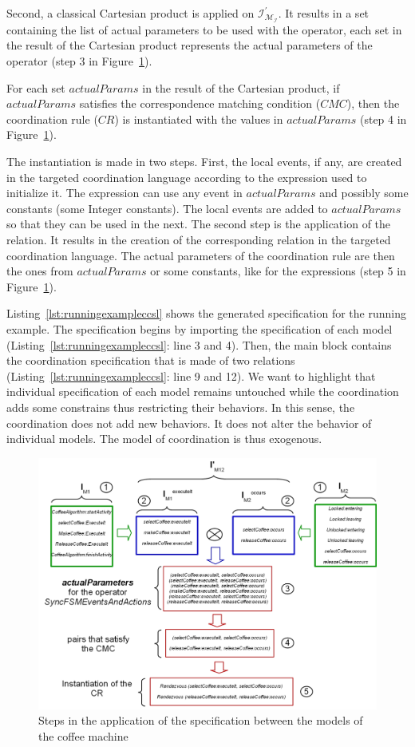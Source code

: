 Second, a classical Cartesian product is applied on $\mathcal{I^{'}_{M_I}}$. It results in a set containing the list of actual parameters to be used with the operator, \ie each set in the result of the Cartesian product represents the actual parameters of the operator (step 3 in Figure~\ref{fig:semantics}). 

For each set $actualParams$ in the result of the Cartesian product, if $actualParams$ satisfies the correspondence matching condition ($CMC$), then the coordination rule ($CR$) is instantiated with the values in $actualParams$ (step 4 in Figure~\ref{fig:semantics}).

The instantiation is made in two steps. First, the local events, if any, are created in the targeted coordination language according to the expression used to initialize it. The expression can use any event in $actualParams$ and possibly some constants (\eg some Integer constants). The local events are added to $actualParams$ so that they can be used in the next. The second step is the application of the relation. It results in the creation of the corresponding relation in the targeted coordination language. The actual parameters of the coordination rule are then the ones from $actualParams$ or some constants, like for the expressions (step 5 in Figure~\ref{fig:semantics}).

Listing~\ref{lst:runningexampleccsl} shows the generated \ccsl specification for the running example. The specification begins by importing the \ccsl specification of each model (Listing~\ref{lst:runningexampleccsl}: line 3 and 4). Then, the main block contains the coordination specification that is made of two relations (Listing~\ref{lst:runningexampleccsl}: line 9 and 12). We want to highlight that individual specification of each model remains untouched while the coordination adds some constrains thus restricting their behaviors. In this sense, the coordination does not add new behaviors. It does not alter the behavior of individual models. The model of coordination is thus exogenous.

\begin{figure}
	\center
	\includegraphics[width=.9\textwidth]{bcool/figs/semantics.jpg}
	\caption{Steps in the application of the \bcool specification between the models of the coffee machine}
	\label{fig:semantics}
\end{figure}




